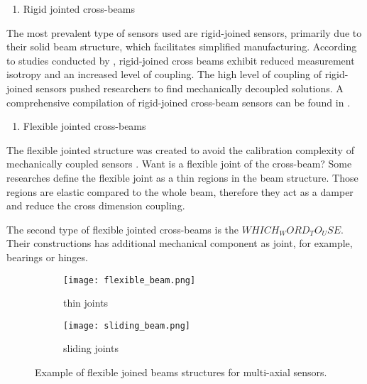 
\begin{enumerate}
    \item Rigid jointed cross-beams
\end{enumerate}
The most prevalent type of sensors used are rigid-joined sensors, primarily due to their solid beam structure, 
which facilitates simplified manufacturing. 
According to studies conducted by \cite{multi_axis_force_sensors_review, beam_structure_math}, 
rigid-joined cross beams exhibit reduced measurement isotropy and an increased level of coupling. 
The high level of coupling of rigid-joined sensors pushed researchers to find mechanically decoupled solutions.
A comprehensive compilation of rigid-joined cross-beam sensors can be found in \cite{multi_axis_force_sensors_review}.

\begin{enumerate}[resume]
    \item Flexible jointed cross-beams
\end{enumerate}

The flexible jointed structure was created to avoid the calibration complexity of mechanically coupled sensors \cite{shape_optimization_decoupled}. 
Want is a flexible joint of the cross-beam? Some researches define the flexible joint as a thin regions in the beam structure. 
Those regions are elastic compared to the whole beam, therefore they act as a damper and reduce the cross dimension coupling. 

The second type of flexible jointed cross-beams is the $WHICH_WORD_TO_USE$. Their constructions has additional mechanical component as joint, for example, bearings or hinges.

\begin{figure}[H]
    \begin{subfigure}[b]{0.5\textwidth}
        \label{fig:flexible_beams_a}
        \texttt{[image: flexible\_beam.png]}
        \caption*{thin joints}
    \end{subfigure}
    \begin{subfigure}[b]{0.5\textwidth}
        \label{fig:flexible_beams_b}
        \texttt{[image: sliding\_beam.png]}
        \caption*{sliding joints}
    \end{subfigure}
    \caption{Example of flexible joined beams structures for multi-axial sensors.}
    \label{fig:flexible_beams}
\end{figure}

